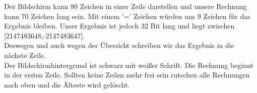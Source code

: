 Der Bildschirm kann 80 Zeichen in einer Zeile darstellen und unsere Rechnung kann 70 Zeichen lang sein. Mit einem '=' Zeichen würden uns 9 Zeichen für das Ergebnis bleiben. Unser Ergebnis ist jedoch 32 Bit lang und liegt zwischen [2147483648,-2147483647].\\
Deswegen und auch wegen der Übersicht schreiben wir das Ergebnis in die nächste Zeile.\\
Der Bildschirmhintergrund ist schwarz mit weißer Schrift. Die Rechnung beginnt in der ersten Zeile. Sollten keine Zeilen mehr frei sein rutschen alle Rechnungen nach oben und die Älteste wird gelöscht.